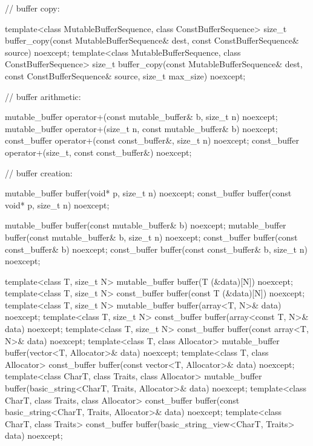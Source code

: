 \begin{codeblock}
{{{{  // buffer copy:

  template<class MutableBufferSequence, class ConstBufferSequence>
    size_t buffer_copy(const MutableBufferSequence& dest,
                       const ConstBufferSequence& source) noexcept;
  template<class MutableBufferSequence, class ConstBufferSequence>
    size_t buffer_copy(const MutableBufferSequence& dest,
                       const ConstBufferSequence& source,
                       size_t max_size) noexcept;

  // buffer arithmetic:

  mutable_buffer operator+(const mutable_buffer& b, size_t n) noexcept;
  mutable_buffer operator+(size_t n, const mutable_buffer& b) noexcept;
  const_buffer operator+(const const_buffer&, size_t n) noexcept;
  const_buffer operator+(size_t, const const_buffer&) noexcept;

  // buffer creation:

  mutable_buffer buffer(void* p, size_t n) noexcept;
  const_buffer buffer(const void* p, size_t n) noexcept;

  mutable_buffer buffer(const mutable_buffer& b) noexcept;
  mutable_buffer buffer(const mutable_buffer& b, size_t n) noexcept;
  const_buffer buffer(const const_buffer& b) noexcept;
  const_buffer buffer(const const_buffer& b, size_t n) noexcept;

  template<class T, size_t N>
    mutable_buffer buffer(T (&data)[N]) noexcept;
  template<class T, size_t N>
    const_buffer buffer(const T (&data)[N]) noexcept;
  template<class T, size_t N>
    mutable_buffer buffer(array<T, N>& data) noexcept;
  template<class T, size_t N>
    const_buffer buffer(array<const T, N>& data) noexcept;
  template<class T, size_t N>
    const_buffer buffer(const array<T, N>& data) noexcept;
  template<class T, class Allocator>
    mutable_buffer buffer(vector<T, Allocator>& data) noexcept;
  template<class T, class Allocator>
    const_buffer buffer(const vector<T, Allocator>& data) noexcept;
  template<class CharT, class Traits, class Allocator>
    mutable_buffer buffer(basic_string<CharT, Traits, Allocator>& data) noexcept;
  template<class CharT, class Traits, class Allocator>
    const_buffer buffer(const basic_string<CharT, Traits, Allocator>& data) noexcept;
  template<class CharT, class Traits>
    const_buffer buffer(basic_string_view<CharT, Traits> data) noexcept;

}}}}
\end{codeblock}
